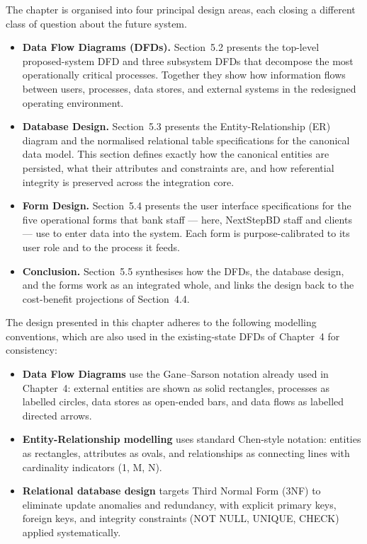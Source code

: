 \documentclass[12pt,a4paper]{report}
\begin{document}
The chapter is organised into four principal design areas, each closing a different
class of question about the future system.

\begin{itemize}[leftmargin=1.6em]
    \item \textbf{Data Flow Diagrams (DFDs).} Section~5.2 presents the top-level
          proposed-system DFD and three subsystem DFDs that decompose the most
          operationally critical processes. Together they show how information
          flows between users, processes, data stores, and external systems in the
          redesigned operating environment.
    \item \textbf{Database Design.} Section~5.3 presents the Entity-Relationship
          (ER) diagram and the normalised relational table specifications for the
          canonical data model. This section defines exactly how the canonical
          entities are persisted, what their attributes and constraints are, and
          how referential integrity is preserved across the integration core.
    \item \textbf{Form Design.} Section~5.4 presents the user interface
          specifications for the five operational forms that bank staff
          --- here, NextStepBD staff and clients --- use to enter data into the
          system. Each form is purpose-calibrated to its user role and to the
          process it feeds.
    \item \textbf{Conclusion.} Section~5.5 synthesises how the DFDs, the
          database design, and the forms work as an integrated whole, and links
          the design back to the cost-benefit projections of Section~4.4.
\end{itemize}

The design presented in this chapter adheres to the following modelling conventions,
which are also used in the existing-state DFDs of Chapter~4 for consistency:

\begin{itemize}[leftmargin=1.6em]
    \item \textbf{Data Flow Diagrams} use the Gane--Sarson notation already
          used in Chapter~4: external entities are shown as solid rectangles,
          processes as labelled circles, data stores as open-ended bars, and data
          flows as labelled directed arrows.
    \item \textbf{Entity-Relationship modelling} uses standard Chen-style notation:
          entities as rectangles, attributes as ovals, and relationships as
          connecting lines with cardinality indicators (1, M, N).
    \item \textbf{Relational database design} targets Third Normal Form (3NF) to
          eliminate update anomalies and redundancy, with explicit primary keys,
          foreign keys, and integrity constraints (NOT NULL, UNIQUE, CHECK) applied
          systematically.
\end{itemize}
\end{document}
